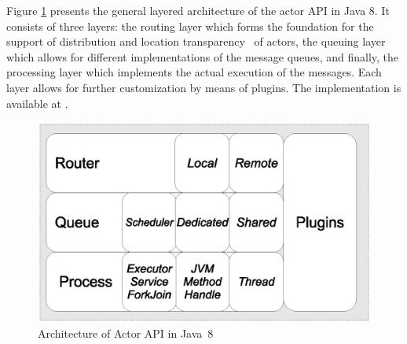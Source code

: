 Figure \ref{fig:actors:arch} presents the general layered architecture of the actor API in Java 8.
It consists of  three layers: the  routing layer  which
forms the foundation for the support of distribution and location transparency~\cite{KarmaniSA09} of actors,
the queuing layer  which allows for different implementations of the message queues, and finally, the processing layer
which implements the actual execution of the messages.
Each layer  allows for further customization by means of plugins.
The implementation is available at .


% 

\begin{figure}[h]
\begin{center}
\includegraphics[scale=.6]{figs/abs-api-java8-2}  
\end{center}
\caption{Architecture of Actor API in Java~8}
\label{fig:actors:arch}
\end{figure} 

